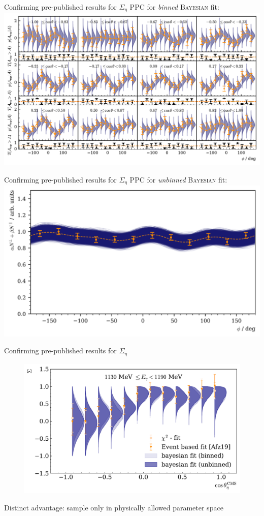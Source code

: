 \documentclass[11pt,aspectratio=169,dvipsnames]{beamer}
\begin{document}
\begin{frame}{Confirming pre-published results for $\Sigma_\eta$}
	PPC for \emph{binned} \textsc{Bayesian} fit:
	\centering
	\includegraphics[width=.9\linewidth]{../../bayes/realdeal/plots/ppd_checks.pdf}
\end{frame}
\begin{frame}{Confirming pre-published results for $\Sigma_\eta$}
	PPC for \emph{unbinned} \textsc{Bayesian} fit:
	\centering
	\includegraphics[width=.9\linewidth]{../../bayes/event_based_fit/plots/eff_PPC.png}
\end{frame}
\begin{frame}{Confirming pre-published results for $\Sigma_\eta$}
	\begin{figure}
		\centering
		\includegraphics[width=.8\linewidth]{../../bayes/event_based_fit/plots/sigma_eta_bin.pdf}
	\end{figure}
	Distinct advantage: sample only in physically allowed parameter space
\end{frame}
\end{document}
